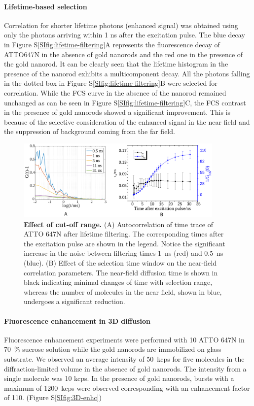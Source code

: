 \paragraph*{Lifetime-based selection}
Correlation for shorter lifetime photons (enhanced signal) was obtained using only the photons arriving within 1 ns after the excitation pulse.
The blue decay in Figure S\ref{SIfig:lifetime-filtering}A represents the fluorescence decay of ATTO647N in the absence of gold nanorods and the red one in the presence of the gold nanorod. It can be clearly seen that the lifetime histogram in the presence of the nanorod exhibits a multicomponent decay.
All the photons falling in the dotted box in Figure S\ref{SIfig:lifetime-filtering}B were selected for correlation.
While the FCS curve in the absence of the nanorod remained unchanged as can be seen in Figure S\ref{SIfig:lifetime-filtering}C, the FCS contrast in the presence of gold nanorods showed a significant improvement.
This is because of the selective consideration of the enhanced signal in the near field and the suppression of background coming from the far field.

\begin{figure}[ht]
  \centering
  \includegraphics[width=0.9\textwidth]{cutoff_effect}
  \makeatletter
  \renewcommand{\fnum@figure}{\figurename~S\thefigure}
  \makeatother{}
  \caption{\textbf{Effect of cut-off range.} (A) Autocorrelation of time trace of ATTO 647N after lifetime filtering.
  The corresponding times after the excitation pulse are shown in the legend.
  Notice the significant increase in the noise between filtering times \SI{1}{\ns} (red) and \SI{0.5}{\ns} (blue).
  (B) Effect of the selection time window on the near-field correlation parameters.
  The near-field diffusion time is shown in black indicating minimal changes of time with selection range, whereas the number of molecules in the near field, shown in blue, undergoes a significant reduction.}
  \label{SIfig:cutoff-effect}
\end{figure}

\newpage
\paragraph*{Fluorescence enhancement in 3D diffusion}
Fluorescence enhancement experiments were performed with \SI{10}{\nM} ATTO 647N in \SI{70}{\percent} sucrose solution while the gold nanorods are immobilized on glass substrate.
We observed an average intensity of \SI{50}{kcps} for five molecules in the diffraction-limited volume in the absence of gold nanorods.
The intensity from a single molecule was 10 kcps.
In the presence of gold nanorods, bursts with a maximum of \SI{1200}{kcps} were observed corresponding with an enhancement factor of 110. (Figure S\ref{SIfig:3D-enhc})

